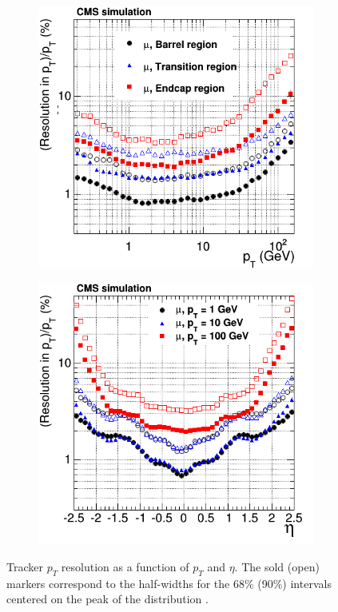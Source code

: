 \begin{figure}[hb]
\centering
  \begin{subfigure}[b]{.475\textwidth}
	\includegraphics[trim = 0mm 0mm 0mm 0mm, clip,width=\textwidth]{images/resolutionPtVsPt.png}
	\end{subfigure}	
   \begin{subfigure}[b]{.475\textwidth}
	\includegraphics[trim = 0mm 0mm 0mm 0mm, clip,width=\textwidth]{images/resolutionPtVsEta.png}
    \end{subfigure}	
  \caption[]
   	{Tracker $p_{T}$ resolution as a function of $p_{T}$ and $\eta$. The sold (open) markers correspond to the half-widths for the 68\% (90\%) intervals centered on the peak of the distribution \cite{TRK11001}.}
    \label{fig:TrackerResolution}
\end{figure}
